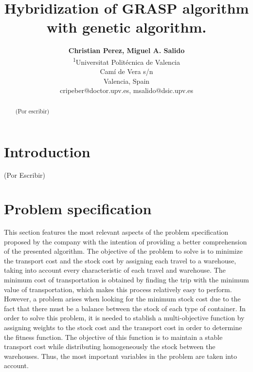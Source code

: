 \documentclass[letterpaper]{article} %
\title{Hybridization of GRASP algorithm with genetic algorithm.}
\author{\Large \textbf{Christian Perez, Miguel A. Salido}\\ %
\textsuperscript{\rm 1}Universitat Politécnica de Valencia\\
Camí de Vera s/n\\
Valencia, Spain\\
cripeber@doctor.upv.es, msalido@dsic.upv.es %
}
\begin{document}
 \maketitle


\begin{abstract}
    (Por escribir)
\end{abstract}
\section*{Introduction}

(Por Escribir)


\section*{Problem specification}

This section features the most relevant aspects of the problem specification proposed by the company with the intention of providing a better comprehension of the presented algorithm. The objective of the problem to solve is to minimize the transport cost and the stock cost by assigning each travel to a warehouse, taking into account every characteristic of each travel and warehouse. The minimum cost of transportation is obtained by finding the trip with the minimum value of transportation, which makes this process relatively easy to perform. However, a problem arises when looking for the minimum stock cost due to the fact that there must be a balance between the stock of each type of container. In order to solve this problem, it is needed to stablish a multi-objective function by assigning weights to the stock cost and the transport cost in order to determine the fitness function. The objective of this function is to maintain a stable transport cost while distributing homogeneously the stock between the warehouses. Thus, the most important variables in the problem are taken into account.
\end{document}
